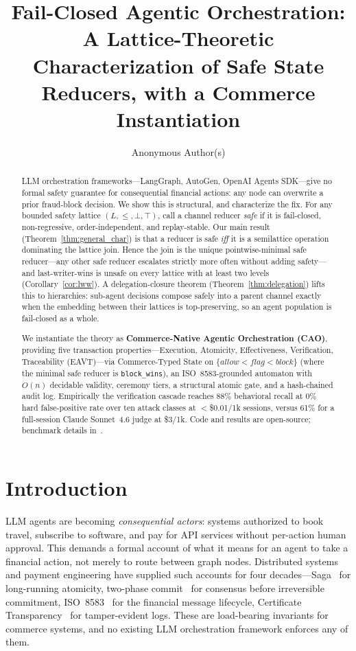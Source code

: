 \documentclass{article}
\title{Fail-Closed Agentic Orchestration: A Lattice-Theoretic Characterization of Safe State Reducers, with a Commerce Instantiation}
\author{%
  Anonymous Author(s)
}
\begin{document}
\maketitle

\begin{abstract}
LLM orchestration frameworks---LangGraph, AutoGen, OpenAI Agents SDK---give no formal safety
guarantee for consequential financial actions: any node can overwrite a prior fraud-block
decision. We show this is structural, and characterize the fix. For any bounded safety lattice
$(L,\le,\bot,\top)$, call a channel reducer \emph{safe} if it is fail-closed, non-regressive,
order-independent, and replay-stable. Our main result (Theorem~\ref{thm:general_char}) is that
a reducer is safe \emph{iff} it is a semilattice operation dominating the lattice join. Hence
the join is the unique pointwise-minimal safe reducer---any other safe reducer escalates
strictly more often without adding safety---and last-writer-wins is unsafe on every lattice
with at least two levels (Corollary~\ref{cor:lww}). A delegation-closure theorem
(Theorem~\ref{thm:delegation}) lifts this to hierarchies: sub-agent decisions compose safely
into a parent channel exactly when the embedding between their lattices is top-preserving, so
an agent population is fail-closed as a whole.

We instantiate the theory as \textbf{Commerce-Native Agentic Orchestration (CAO)}, providing
five transaction properties---Execution, Atomicity, Effectiveness, Verification, Traceability
(EAVT)---via Commerce-Typed State on $\{\textit{allow}<\textit{flag}<\textit{block}\}$ (where
the minimal safe reducer is \texttt{block\_wins}), an ISO~8583-grounded automaton with $O(n)$
decidable validity, ceremony tiers, a structural atomic gate, and a hash-chained audit log.
Empirically the verification cascade reaches 88\% behavioral recall at 0\% hard false-positive
rate over ten attack classes at $<$\$0.01/1k sessions, versus 61\% for a full-session Claude
Sonnet~4.6 judge at \$3/1k. Code and results are open-source; benchmark details
in~\cite{acpbench}.
\end{abstract}

\section{Introduction}

LLM agents are becoming \emph{consequential actors}: systems authorized to book travel,
subscribe to software, and pay for API services without per-action human approval. This
demands a formal account of what it means for an agent to take a financial action, not merely
to route between graph nodes. Distributed systems and payment engineering have supplied such
accounts for four decades---Saga~\cite{saga} for long-running atomicity, two-phase
commit~\cite{2pc} for consensus before irreversible commitment, ISO~8583~\cite{iso8583} for
the financial message lifecycle, Certificate Transparency~\cite{ct} for tamper-evident logs.
These are load-bearing invariants for commerce systems, and no existing LLM orchestration
framework enforces any of them.
\end{document}
